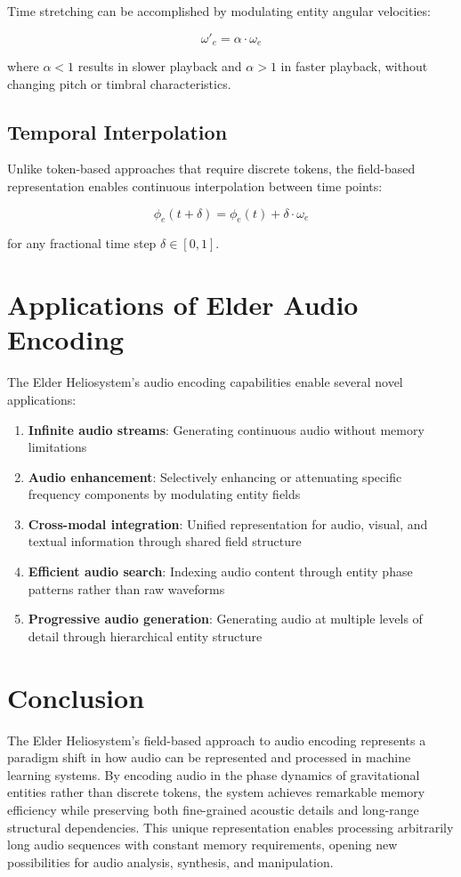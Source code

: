 Time stretching can be accomplished by modulating entity angular velocities:

\begin{equation}
\omega'_e = \alpha \cdot \omega_e
\end{equation}

where $\alpha < 1$ results in slower playback and $\alpha > 1$ in faster playback, without changing pitch or timbral characteristics.

\subsection{Temporal Interpolation}

Unlike token-based approaches that require discrete tokens, the field-based representation enables continuous interpolation between time points:

\begin{equation}
\phi_e(t + \delta) = \phi_e(t) + \delta \cdot \omega_e
\end{equation}

for any fractional time step $\delta \in [0,1]$.

\section{Applications of Elder Audio Encoding}

The Elder Heliosystem's audio encoding capabilities enable several novel applications:

\begin{enumerate}
    \item \textbf{Infinite audio streams}: Generating continuous audio without memory limitations
    \item \textbf{Audio enhancement}: Selectively enhancing or attenuating specific frequency components by modulating entity fields
    \item \textbf{Cross-modal integration}: Unified representation for audio, visual, and textual information through shared field structure
    \item \textbf{Efficient audio search}: Indexing audio content through entity phase patterns rather than raw waveforms
    \item \textbf{Progressive audio generation}: Generating audio at multiple levels of detail through hierarchical entity structure
\end{enumerate}

\section{Conclusion}

The Elder Heliosystem's field-based approach to audio encoding represents a paradigm shift in how audio can be represented and processed in machine learning systems. By encoding audio in the phase dynamics of gravitational entities rather than discrete tokens, the system achieves remarkable memory efficiency while preserving both fine-grained acoustic details and long-range structural dependencies. This unique representation enables processing arbitrarily long audio sequences with constant memory requirements, opening new possibilities for audio analysis, synthesis, and manipulation.